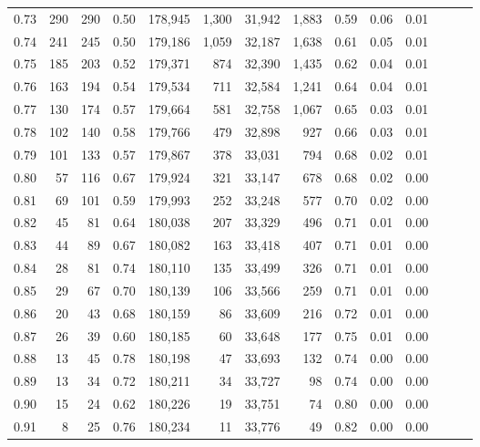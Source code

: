 \begin{tabular}{rrrrrrrrrrrrrr}
0.73 &    290 &    290 &  0.50 &  178,945 &    1,300 &  31,942 &   1,883 &  0.59 &  0.06 &      0.01 \\
0.74 &    241 &    245 &  0.50 &  179,186 &    1,059 &  32,187 &   1,638 &  0.61 &  0.05 &      0.01 \\
0.75 &    185 &    203 &  0.52 &  179,371 &      874 &  32,390 &   1,435 &  0.62 &  0.04 &      0.01 \\
0.76 &    163 &    194 &  0.54 &  179,534 &      711 &  32,584 &   1,241 &  0.64 &  0.04 &      0.01 \\
0.77 &    130 &    174 &  0.57 &  179,664 &      581 &  32,758 &   1,067 &  0.65 &  0.03 &      0.01 \\
0.78 &    102 &    140 &  0.58 &  179,766 &      479 &  32,898 &     927 &  0.66 &  0.03 &      0.01 \\
0.79 &    101 &    133 &  0.57 &  179,867 &      378 &  33,031 &     794 &  0.68 &  0.02 &      0.01 \\
0.80 &     57 &    116 &  0.67 &  179,924 &      321 &  33,147 &     678 &  0.68 &  0.02 &      0.00 \\
0.81 &     69 &    101 &  0.59 &  179,993 &      252 &  33,248 &     577 &  0.70 &  0.02 &      0.00 \\
0.82 &     45 &     81 &  0.64 &  180,038 &      207 &  33,329 &     496 &  0.71 &  0.01 &      0.00 \\
0.83 &     44 &     89 &  0.67 &  180,082 &      163 &  33,418 &     407 &  0.71 &  0.01 &      0.00 \\
0.84 &     28 &     81 &  0.74 &  180,110 &      135 &  33,499 &     326 &  0.71 &  0.01 &      0.00 \\
0.85 &     29 &     67 &  0.70 &  180,139 &      106 &  33,566 &     259 &  0.71 &  0.01 &      0.00 \\
0.86 &     20 &     43 &  0.68 &  180,159 &       86 &  33,609 &     216 &  0.72 &  0.01 &      0.00 \\
0.87 &     26 &     39 &  0.60 &  180,185 &       60 &  33,648 &     177 &  0.75 &  0.01 &      0.00 \\
0.88 &     13 &     45 &  0.78 &  180,198 &       47 &  33,693 &     132 &  0.74 &  0.00 &      0.00 \\
0.89 &     13 &     34 &  0.72 &  180,211 &       34 &  33,727 &      98 &  0.74 &  0.00 &      0.00 \\
0.90 &     15 &     24 &  0.62 &  180,226 &       19 &  33,751 &      74 &  0.80 &  0.00 &      0.00 \\
0.91 &      8 &     25 &  0.76 &  180,234 &       11 &  33,776 &      49 &  0.82 &  0.00 &      0.00 \\

\end{tabular}
